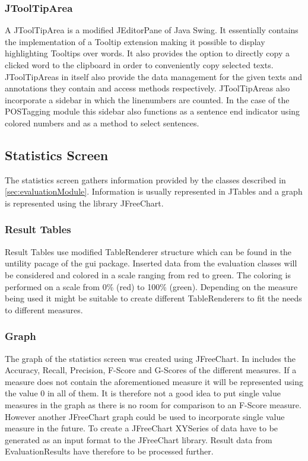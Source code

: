 \documentclass[10pt,a4paper,titlepage]{report}
\begin{document}
	\subsubsection{JToolTipArea}
	A JToolTipArea is a modified JEditorPane of Java Swing. It essentially contains the implementation of a Tooltip extension making it possible to display highlighting Tooltips over words. It also provides the option to directly copy a clicked word to the clipboard in order to conveniently copy selected texts. JToolTipAreas in itself also provide the data management for the given texts and annotations they contain and access methods respectively. JToolTipAreas also incorporate a sidebar in which the linenumbers are counted. In the case of the POSTagging module this sidebar also functions as a sentence end indicator using colored numbers and as a method to select sentences.
	\subsection{Statistics Screen}
	The statistics screen gathers information provided by the classes described in \ref{sec:evaluationModule}. 
	Information is usually represented in JTables and a graph is represented using the library JFreeChart.
	\subsubsection{Result Tables}
	Result Tables use modified TableRenderer structure which can be found in the untility pacage of the gui package. Inserted data from the evaluation classes will be considered and colored in a scale ranging from red to green. The coloring is performed on a scale from 0\% (red) to 100\% (green). Depending on the measure being used it might be suitable to create different TableRenderers to fit the needs to different measures.
	\subsubsection{Graph}
	The graph of the statistics screen was created using JFreeChart. In includes the Accuracy, Recall, Precision, F-Score and G-Scores of the different measures. If a measure does not contain the aforementioned measure it will be represented using the value 0 in all of them. It is therefore not a good idea to put single value measures in the graph as there is no room for comparison to an F-Score measure. However another JFreeChart graph could be used to incorporate single value measure in the future. To create a JFreeChart XYSeries of data have to be generated as an input format to the JFreeChart library. Result data from EvaluationResults have therefore to be processed further.
\end{document}
